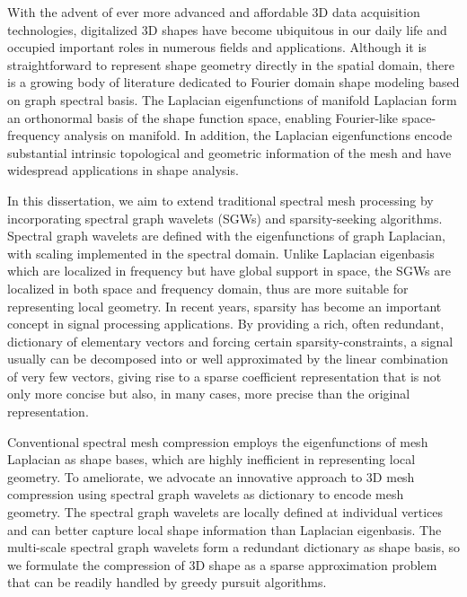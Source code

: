 \documentclass[12pt,letterpaper,twosided]{report}
\numberwithin{equation}{section}
\begin{document}
With the advent of ever more advanced and affordable 3D data acquisition
technologies, digitalized 3D shapes have become ubiquitous in our daily life
and occupied important roles in numerous fields and applications. Although
it is straightforward to represent shape geometry directly in the spatial
domain, there is a growing body of literature dedicated to Fourier domain
shape modeling based on graph spectral basis. The Laplacian eigenfunctions
of manifold Laplacian form an orthonormal basis of the shape function space,
enabling Fourier-like space-frequency analysis on manifold. In addition, the
Laplacian eigenfunctions encode substantial intrinsic topological and geometric
information of the mesh and have widespread applications in shape analysis.

In this dissertation, we aim to extend traditional spectral mesh processing
by incorporating spectral graph wavelets (SGWs) and sparsity-seeking
algorithms. Spectral graph wavelets are defined with the eigenfunctions of
graph Laplacian, with scaling implemented in the spectral domain. Unlike
Laplacian eigenbasis which are localized in frequency but have global support
in space, the SGWs are localized in both space and frequency domain, thus are
more suitable for representing local geometry. In recent years, sparsity has
become an important concept in signal processing applications. By providing a
rich, often redundant, dictionary of elementary vectors and forcing certain
sparsity-constraints, a signal usually can be decomposed into or well
approximated by the linear combination of very few vectors, giving rise to a
sparse coefficient representation that is not only more concise but also, in
many cases, more precise than the original representation.

Conventional spectral mesh compression employs the eigenfunctions of mesh
Laplacian as shape bases, which are highly inefficient in representing local
geometry. To ameliorate, we advocate an innovative approach to 3D mesh
compression using spectral graph wavelets as dictionary to encode mesh geometry.
The spectral graph wavelets are locally defined at individual vertices and can
better capture local shape information than Laplacian eigenbasis. The
multi-scale spectral graph wavelets form a redundant dictionary as shape basis,
so we formulate the compression of 3D shape as a sparse approximation problem
that can be readily handled by greedy pursuit algorithms.
\end{document}
